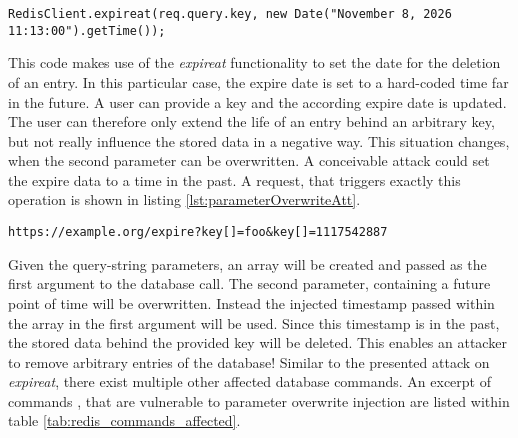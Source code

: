 \begin{lstlisting}[caption={Vulnerable NodeJS example for parameter overwrite injection against Redis}, label={lst:parameterOverwriteApp}]
RedisClient.expireat(req.query.key, new Date("November 8, 2026 11:13:00").getTime());
\end{lstlisting}

This code makes use of the \emph{expireat} functionality to set the date for the deletion of an entry. In this particular case, the expire date is set to a hard-coded time far in the future. A user can provide a key and the according expire date is updated. The user can therefore only extend the life of an entry behind an arbitrary key, but not really influence the stored data in a negative way. This situation changes, when the second parameter can be overwritten. A conceivable attack could set the expire data to a time in the past. A request, that triggers exactly this operation is shown in listing \ref{lst:parameterOverwriteAtt}. \\

\begin{lstlisting}[caption={Attack vector against Redis for query selector injection via the query-string parameter}, label={lst:parameterOverwriteAtt}]
https://example.org/expire?key[]=foo&key[]=1117542887
\end{lstlisting}

Given the query-string parameters, an array will be created and passed as the first argument to the database call. The second parameter, containing a future point of time will be overwritten. Instead the injected timestamp passed within the array in the first argument will be used. Since this timestamp is in the past, the stored data behind the provided key will be deleted. This enables an attacker to remove arbitrary entries of the database! Similar to the presented attack on \emph{expireat}, there exist multiple other affected database commands. An excerpt of commands \cite{Sanfilippo2016}, that are vulnerable to parameter overwrite injection are listed within table \ref{tab:redis_commands_affected}. \\

